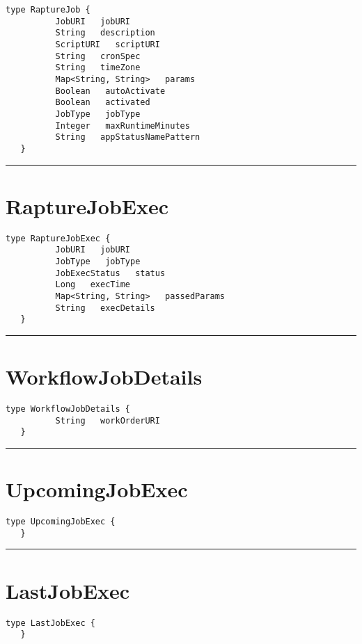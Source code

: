 \begin{lstlisting}[style=nonumbers]
   type RaptureJob {
          JobURI   jobURI
          String   description
          ScriptURI   scriptURI
          String   cronSpec
          String   timeZone
          Map<String, String>   params
          Boolean   autoActivate
          Boolean   activated
          JobType   jobType
          Integer   maxRuntimeMinutes
          String   appStatusNamePattern
   }
\end{lstlisting}

\rule{12cm}{2pt}
\section{RaptureJobExec}
\label{type:RaptureJobExec}

\begin{lstlisting}[style=nonumbers]
   type RaptureJobExec {
          JobURI   jobURI
          JobType   jobType
          JobExecStatus   status
          Long   execTime
          Map<String, String>   passedParams
          String   execDetails
   }
\end{lstlisting}

\rule{12cm}{2pt}
\section{WorkflowJobDetails}
\label{type:WorkflowJobDetails}

\begin{lstlisting}[style=nonumbers]
   type WorkflowJobDetails {
          String   workOrderURI
   }
\end{lstlisting}

\rule{12cm}{2pt}
\section{UpcomingJobExec}
\label{type:UpcomingJobExec}

\begin{lstlisting}[style=nonumbers]
   type UpcomingJobExec {
   }
\end{lstlisting}

\rule{12cm}{2pt}
\section{LastJobExec}
\label{type:LastJobExec}

\begin{lstlisting}[style=nonumbers]
   type LastJobExec {
   }
\end{lstlisting}

